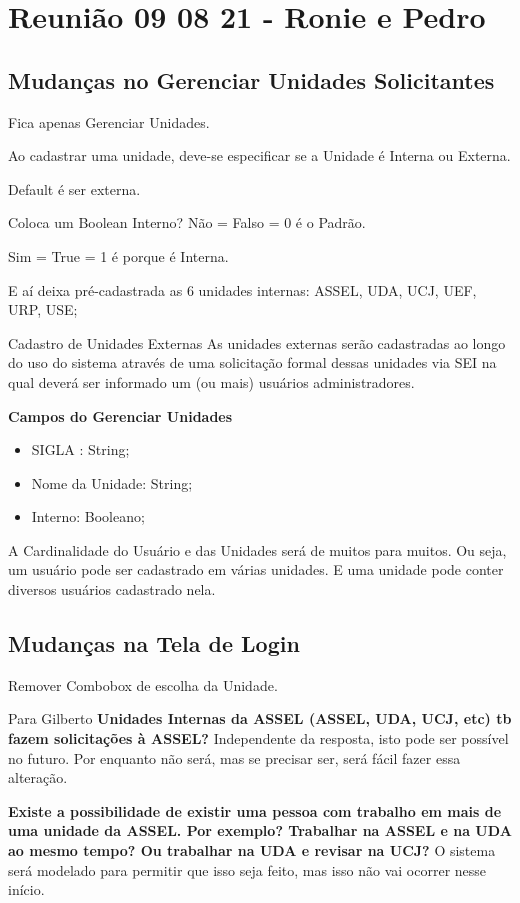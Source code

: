 \section{Reunião 09 08 21 - Ronie e Pedro}

	\subsection{Mudanças no Gerenciar Unidades Solicitantes}
	
	\mssim Fica apenas Gerenciar Unidades.
	
	Ao cadastrar uma unidade, deve-se especificar se a Unidade é Interna ou Externa.

	Default é ser externa.
	
	Coloca um Boolean Interno? Não = Falso = 0 é o Padrão.
	
	Sim = True = 1 é porque é Interna.
	
	E aí deixa pré-cadastrada as 6 unidades internas: ASSEL, UDA, UCJ, UEF, URP, USE; 
		
	\begin{funcionalidade}{Cadastro de Unidades Externas}
		As unidades externas serão cadastradas ao longo do uso do sistema através de uma solicitação formal dessas unidades via SEI na qual deverá ser informado um (ou mais) usuários administradores.
	\end{funcionalidade}
	
	\textbf{Campos do Gerenciar Unidades}
	
	\begin{itemize}
		\item SIGLA : String;
		\item Nome da Unidade: String;		
		\item Interno: Booleano;
	\end{itemize}
	
	A Cardinalidade do Usuário e das Unidades será de muitos para muitos. Ou seja, um usuário pode ser cadastrado em várias unidades.	E uma unidade pode conter diversos usuários cadastrado nela.		

	\subsection{Mudanças na Tela de Login}
	
	\mssim Remover Combobox de escolha da Unidade.

	\begin{pergunta}{Para Gilberto}
		\mssim \textbf{Unidades Internas da ASSEL (ASSEL, UDA, UCJ, etc) tb fazem solicitações à ASSEL?} Independente da resposta, isto pode ser possível no futuro. Por enquanto não será, mas se precisar ser, será fácil fazer essa alteração.	

		
		\mssim \textbf{Existe a possibilidade de existir uma pessoa com trabalho em mais de uma unidade da ASSEL. Por exemplo? Trabalhar na ASSEL e na UDA ao mesmo tempo? Ou trabalhar na UDA e revisar na UCJ?} O sistema será modelado para permitir que isso seja feito, mas isso não vai ocorrer nesse início.		
	\end{pergunta}	

